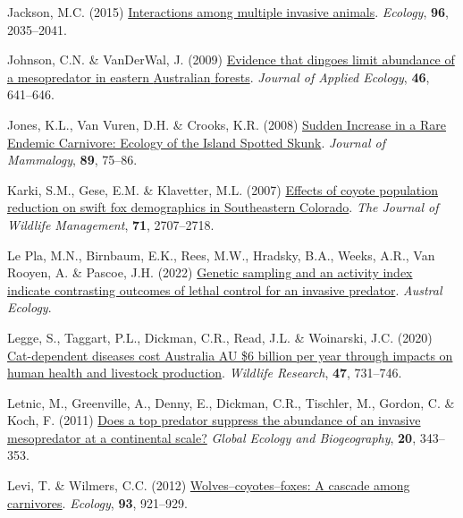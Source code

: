 \documentclass[preprint, 3p, authoryear]{elsarticle} %
\newlength{\cslhangindent}
\newlength{\cslentryspacingunit} %
\newenvironment{CSLReferences}[2] %
 {%
  \setlength{\parindent}{0pt}
  \ifodd #1
  \let\oldpar\par
  \def\par{\hangindent=\cslhangindent\oldpar}
  \fi
  \setlength{\parskip}{#2\cslentryspacingunit}
 }%
 {}
\begin{document}
\begin{CSLReferences}{1}{0}
\leavevmode{}%
Jackson, M.C. (2015) \href{https://doi.org/10.1890/15-0171.1}{Interactions among multiple invasive animals}. \emph{Ecology}, \textbf{96}, 2035--2041.

\leavevmode{}%
Johnson, C.N. \& VanDerWal, J. (2009) \href{https://doi.org/10.1111/j.1365-2664.2009.01650.x}{Evidence that dingoes limit abundance of a mesopredator in eastern {{A}ustralian} forests}. \emph{Journal of Applied Ecology}, \textbf{46}, 641--646.

\leavevmode{}%
Jones, K.L., Van Vuren, D.H. \& Crooks, K.R. (2008) \href{https://doi.org/10.1644/07-MAMM-A-034.1}{{Sudden Increase in a Rare Endemic Carnivore: Ecology of the Island Spotted Skunk}}. \emph{Journal of Mammalogy}, \textbf{89}, 75--86.

\leavevmode{}%
Karki, S.M., Gese, E.M. \& Klavetter, M.L. (2007) \href{https://doi.org/10.2193/2006-275}{Effects of coyote population reduction on swift fox demographics in {Southeastern Colorado}}. \emph{The Journal of Wildlife Management}, \textbf{71}, 2707--2718.

\leavevmode{}%
Le Pla, M.N., Birnbaum, E.K., Rees, M.W., Hradsky, B.A., Weeks, A.R., Van Rooyen, A. \& Pascoe, J.H. (2022) \href{https://doi.org/10.1111/aec.13182}{Genetic sampling and an activity index indicate contrasting outcomes of lethal control for an invasive predator}. \emph{Austral Ecology}.

\leavevmode{}%
Legge, S., Taggart, P.L., Dickman, C.R., Read, J.L. \& Woinarski, J.C. (2020) \href{https://doi.org/10.1071/WR20089}{Cat-dependent diseases cost {Australia AU \$6} billion per year through impacts on human health and livestock production}. \emph{Wildlife Research}, \textbf{47}, 731--746.

\leavevmode{}%
Letnic, M., Greenville, A., Denny, E., Dickman, C.R., Tischler, M., Gordon, C. \& Koch, F. (2011) \href{https://doi.org/10.1111/j.1466-8238.2010.00600.x}{Does a top predator suppress the abundance of an invasive mesopredator at a continental scale?} \emph{Global Ecology and Biogeography}, \textbf{20}, 343--353.

\leavevmode{}%
Levi, T. \& Wilmers, C.C. (2012) \href{https://doi.org/10.1890/11-0165.1}{Wolves--coyotes--foxes: A cascade among carnivores}. \emph{Ecology}, \textbf{93}, 921--929.


\end{CSLReferences}
\end{document}
